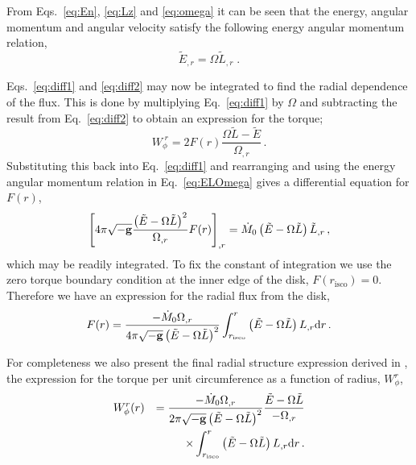 From Eqs.\ \ref{eq:En}, \ref{eq:Lz} and \ref{eq:omega} it can be seen that the energy, angular momentum and angular velocity satisfy the following energy angular momentum relation,
\begin{equation}\label{eq:ELOmega} \tilde{E}_{,r}=\Omega \tilde{L}_{,r} \; .\end{equation}

Eqs.\ \ref{eq:diff1} and \ref{eq:diff2} may now be integrated to find the radial dependence of the flux. This is done by multiplying Eq.\ \ref{eq:diff1} by $\Omega$ and subtracting the result from Eq.\ \ref{eq:diff2} to obtain an expression for the torque;
\begin{equation} W_{\phi}^{\; r} = 2 F(r) \frac{\Omega \tilde{L}-\tilde{E}}{\Omega _{,r}}\, . \end{equation}
Substituting this back into Eq.\ \ref{eq:diff1} and rearranging and using the energy angular momentum relation in Eq.\ \ref{eq:ELOmega} gives a differential equation for $F(r)$,
\begin{equation} \left[ 4\pi \sqrt{-{\bf{g}}}\frac{\left(\tilde{E}-\Omega\tilde{L}\right)^{2}}{\Omega_{,r}} F(r) \right]_{,r} = \dot{M}_{0}\left(\tilde{E}-\Omega\tilde{L}\right)\tilde{L}_{,r}\, , \end{equation}
which may be readily integrated. To fix the constant of integration we use the zero torque boundary condition at the inner edge of the disk, $F(r_{\textrm{isco}})=0$. Therefore we have an expression for the radial flux from the disk,
\begin{equation}\label{eq:radialflux} F(r)=\frac{-\dot{M}_{0}\Omega_{,r}}{4\pi \sqrt{-{\bf{g}}}\left( \tilde{E}-\Omega \tilde{L} \right)^{2}} \int_{r_{\textrm{isco}}}^{r}\left(\tilde{E}-\Omega \tilde{L}\right) L_{,r} \textrm{d}r \, .\end{equation}

For completeness we also present the final radial structure expression derived in \cite{1974ApJ...191..499P}, the expression for the torque per unit circumference as a function of radius, $W_{\phi}^{r}$,
\begin{eqnarray} &W_{\phi}^{r}(r)&=\frac{-\dot{M}_{0}\Omega_{,r}}{2\pi \sqrt{-{\bf{g}}}\left( \tilde{E}-\Omega \tilde{L} \right)^{2}} \frac{\tilde{E}-\Omega \tilde{L}}{-\Omega_{,r}}\nonumber \\
&&\quad\times\int_{r_{\textrm{isco}}}^{r}\left(\tilde{E}-\Omega \tilde{L}\right) L_{,r} \textrm{d}r  \, .\end{eqnarray}

